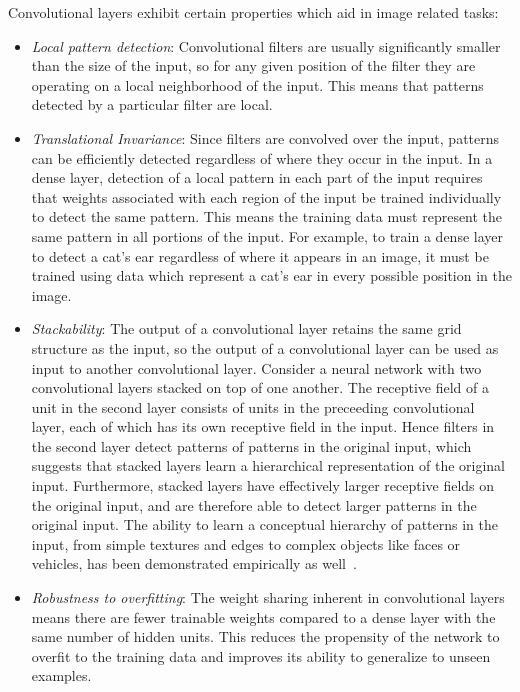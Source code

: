 Convolutional layers exhibit certain properties which aid in image related tasks:
\begin{itemize}
\item
\textit{Local pattern detection}: Convolutional filters are usually significantly smaller than the size of the input, so for any given position of the filter they are operating on a local neighborhood of the input. 
This means that patterns detected by a particular filter are local.
\item
\textit{Translational Invariance}: Since filters are convolved over the input, patterns can be efficiently detected regardless of where they occur in the input.
In a dense layer, detection of a local pattern in each part of the input requires that weights associated with each region of the input be trained individually to detect the same pattern.
This means the training data must represent the same pattern in all portions of the input. 
For example, to train a dense layer to detect a cat's ear regardless of where it appears in an image, it must be trained using data which represent a cat's ear in every possible position in the image.
\item
\textit{Stackability}: The output of a convolutional layer retains the same grid structure as the input, so the output of a convolutional layer can be used as input to another convolutional layer.
Consider a neural network with two convolutional layers stacked on top of one another.
The receptive field of a unit in the second layer consists of units in the preceeding convolutional layer, each of which has its own receptive field in the input.
Hence filters in the second layer detect patterns of patterns in the original input, which suggests that stacked layers learn a hierarchical representation of the original input.
Furthermore, stacked layers have effectively larger receptive fields on the original input, and are therefore able to detect larger patterns in the original input.
The ability to learn a conceptual hierarchy of patterns in the input, from simple textures and edges to complex objects like faces or vehicles, has been demonstrated empirically as well~\cite{zeiler2013}.
\item
\textit{Robustness to overfitting}: The weight sharing inherent in convolutional layers means there are fewer trainable weights compared to a dense layer with the same number of hidden units. 
This reduces the propensity of the network to overfit to the training data and improves its ability to generalize to unseen examples.
\end{itemize}

